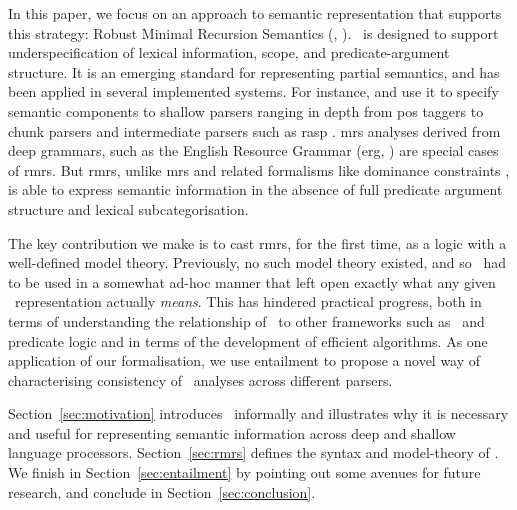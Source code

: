 In this paper, we focus on an approach to
semantic representation that supports this strategy: Robust Minimal
Recursion Semantics (\rmrs, ).
\rmrs\ is designed to support underspecification of lexical information,
scope, and predicate-argument structure.  It is an emerging standard
for representing partial semantics, and has been applied in
several implemented systems.  For instance, 
and  use it to specify semantic components to
shallow parsers ranging in depth from {\sc pos} taggers to chunk
parsers and intermediate parsers such as {\sc rasp}
\cite{briscoe:etal:2006}.  {\sc mrs} analyses
\cite{copestake:etal:2005} derived from deep grammars, such as the
English Resource Grammar ({\sc erg}, \cite{copestake:flickinger:2000})
are special cases of {\sc rmrs}.  But {\sc rmrs}, unlike {\sc mrs} and
related formalisms like dominance constraints \cite{egg:etal:2001}, is
able to express semantic information in the absence of full predicate
argument structure and lexical subcategorisation.

The key contribution we make is to cast {\sc rmrs}, for the first
time, as a logic with a well-defined model theory.  Previously, no
such model theory existed, and so \rmrs\ had to be used in a somewhat
ad-hoc manner that left open exactly what any given \rmrs\
representation actually \emph{means}.  This has hindered 
practical progress, both in terms of understanding the relationship of
\rmrs\ to other frameworks such as \mrs\ and predicate logic and in
terms of the development of efficient algorithms.  As one application
of our formalisation, we use
entailment to propose a
novel way of characterising consistency of \rmrs\ analyses across
different parsers.

Section~\ref{sec:motivation} introduces \rmrs\ informally and
illustrates why it is necessary and useful for representing semantic
information across deep and shallow language processors.
Section~\ref{sec:rmrs} defines the syntax and model-theory of \rmrs.
We finish in Section~\ref{sec:entailment} by pointing out some avenues
for future research, and conclude in Section~\ref{sec:conclusion}.



